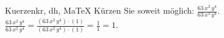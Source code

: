 \begin{MAufgabe}{Kuerzen}{kr, dh, MaTeX}
K\"urzen Sie soweit m\"oglich: $\frac{63\, x^2\, y^4}{63\, x^2\, y^4}$.\\ 
\ifLsg\MLoesung
\quad $\frac{63\, x^2\, y^4}{63\, x^2\, y^4}=\frac{(63\, x^2\, y^4)\cdot(1)}{(63\, x^2\, y^4)\cdot(1)}=\frac{1}{1}=1$.\else\relax\fi
 \end{MAufgabe}